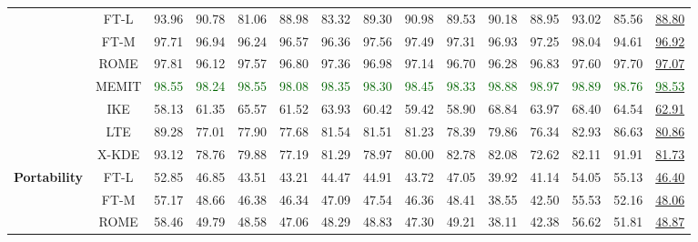 \begin{table*}[!h]
{\begin{tabular}{ccccccccccccccc}
            & FT-L &  93.96 &  90.78 &  81.06 &  88.98 &  83.32 &  89.30 &  90.98 &  89.53 &  90.18 &  88.95 &  93.02 &  85.56 &  \underline{88.80} \\
            & FT-M &  97.71 &  96.94 &  96.24 &  96.57 &  96.36 &  97.56 &  97.49 &  97.31 &  96.93 &  97.25 &  98.04 &  94.61 &  \underline{96.92} \\
            & ROME &  97.81 &  96.12 &  97.57 &  96.80 &  97.36 &  96.98 &  97.14 &  96.70 &  96.28 &  96.83 &  97.60 &  97.70 &  \underline{97.07} \\
            & MEMIT &  \textcolor{darkgreen}{98.55} &  \textcolor{darkgreen}{98.24} &  \textcolor{darkgreen}{98.55} &  \textcolor{darkgreen}{98.08} &  \textcolor{darkgreen}{98.35} &  \textcolor{darkgreen}{98.30} &  \textcolor{darkgreen}{98.45} &  \textcolor{darkgreen}{98.33} &  \textcolor{darkgreen}{98.88} &  \textcolor{darkgreen}{98.97} &  \textcolor{darkgreen}{98.89} &  \textcolor{darkgreen}{98.76} &  \underline{\textcolor{darkgreen}{98.53}} \\
            & IKE & 58.13 & 61.35 & 65.57 & 61.52 & 63.93 & 60.42 & 59.42 & 58.90 & 68.84 & 63.97 & 68.40 & 64.54 & \underline{62.91 }\\
            & LTE & 89.28 & 77.01 & 77.90 & 77.68 & 81.54 & 81.51 & 81.23 & 78.39 & 79.86 & 76.34 & 82.93 & 86.63 & \underline{80.86} \\
           \cmidrule{2-15}
           & X-KDE & 93.12 & 78.76 & 79.88 & 77.19 & 81.29 & 78.97 & 80.00 & 82.78 & 82.08 & 72.62 & 82.11 & 91.91 & \underline{81.73} \\ 
           \midrule
           \multirow{7}{*}{\textbf{Portability}} 
           & FT-L &  52.85 &  46.85 &  43.51 &  43.21 &  44.47 &  44.91 &  43.72 &  47.05 &  39.92 &  41.14 &  54.05 &  55.13 &  \underline{46.40} \\
           & FT-M &  57.17 &  48.66 &  46.38 &  46.34 &  47.09 &  47.54 &  46.36 &  48.41 &  38.55 &  42.50 &  55.53 &  52.16 &  \underline{48.06} \\    
           & ROME &  58.46 &  49.79 &  48.58 &  47.06 &  48.29 &  48.83 &  47.30 &  49.21 &  38.11 &  42.38 &  56.62 &  51.81 &  \underline{48.87} \\

\end{tabular}}
\end{table*}
